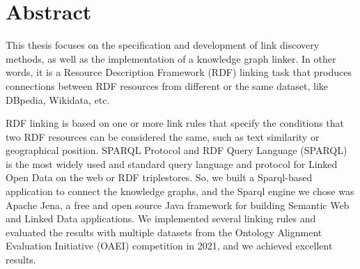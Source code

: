 
\newpage

\chapter*{Abstract}


This thesis focuses on the specification and development of link discovery methods, as well as the implementation of a knowledge graph linker. In other words, it is a Resource Description Framework (RDF) linking task that produces connections between RDF resources from different or the same dataset, like DBpedia, Wikidata, etc. 

RDF linking is based on one or more link rules that specify the conditions that two RDF resources can be considered the same, such as text similarity or geographical position. SPARQL Protocol and RDF Query Language (SPARQL) is the most widely used and standard query language and protocol for Linked Open Data on the web or RDF triplestores. So, we built a Sparql-based application to connect the knowledge graphs, and the Sparql engine we chose was Apache Jena, a free and open source Java framework for building Semantic Web and Linked Data applications. We implemented several linking rules and evaluated the results with multiple datasets from the Ontology Alignment Evaluation Initiative (OAEI) competition in 2021, and we achieved excellent results.





\hspace{10pt}
